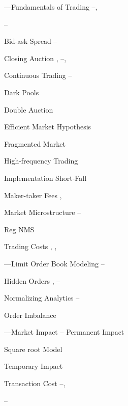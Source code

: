 \begin{multicols}{2}
\noindent ---Fundamentals of Trading \hfill \pageref{in:fund_trade1}--\pageref{in:fund_trade2}, \par \hfill \pageref{in:fund_trade3}--\pageref{in:fund_trade4} \par
\twoindent Bid-ask Spread \hfill \pageref{in:bidask1}--\pageref{in:bidask2} \par
\twoindent Closing Auction \hfill \pageref{in:close1}, \pageref{in:close2}--\pageref{in:close3}, \pageref{in:close4} \par
\twoindent Continuous Trading \hfill \pageref{in:cont_trade1}--\pageref{in:cont_trade2} \par
\twoindent Dark Pools \hfill \pageref{in:dark} \par
\twoindent Double Auction \hfill \pageref{in:double} \par
\twoindent Efficient Market Hypothesis \hfill \pageref{in:efficient} \par
\twoindent Fragmented Market \hfill \pageref{in:fragmented} \par
\twoindent High-frequency Trading \hfill \pageref{in:higheff} \par
\twoindent Implementation Short-Fall \hfill \pageref{in:shortfall} \par
\twoindent Maker-taker Fees \hfill \pageref{in:takerfee1}, \pageref{in:takerfee2} \par
\twoindent Market Microstructure \hfill \pageref{in:micro1}--\pageref{in:micro2} \par
\twoindent Reg NMS \hfill \pageref{in:regnms} \par
\twoindent Trading Costs \hfill \pageref{in:tradecost1}, \pageref{in:tradecost2}, \pageref{in:tradecost3} \par
\vspace{\baselineskip}


\noindent ---Limit Order Book Modeling  \pageref{in:labmod1}--\pageref{in:labmod2} \par
\twoindent Hidden Orders \hfill \pageref{in:hidden1}, \pageref{in:hidden2}--\pageref{in:hidden3} \par
\twoindent Normalizing Analytics \hfill \pageref{in:norm1}--\pageref{in:norm2} \par
\twoindent Order Imbalance \hfill \pageref{in:imbalance} \par
\vspace{\baselineskip}


\noindent ---Market Impact \hfill \pageref{in:impact1}--\pageref{in:impact2}
\twoindent Permanent Impact \hfill \pageref{in:permimp} \par
\twoindent Square root Model \hfill \pageref{in:sqmodel} \par
\twoindent Temporary Impact \hfill \pageref{in:tempimpact} \par
\twoindent Transaction Cost \hfill \pageref{in:transcost1}--\pageref{in:transcost2}, \par \hfill \pageref{in:transcost3}--\pageref{in:transcost4} \par
\vspace{\baselineskip}



\end{multicols}
